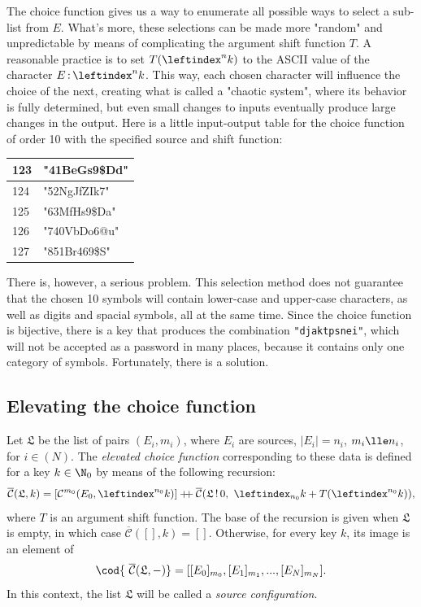 \documentclass[12pt, a4paper]{article}
\renewcommand{\C}{\mathcal{C}}
\newcommand{\CC}{\overline{\mathcal{C}}}
\newcommand{\conf}{\mathfrak{L}}
\newcommand{\dop}{\mathbin{{+}\hspace{-1mm}{+}}}
\newcommand{\lli}[1]{\leftindex_{#1}}
\newcommand{\lui}[1]{\leftindex^{#1}}
\newcommand{\elt}{\mathop{:}}
\newcommand{\wo}{\mathop{!}}
\begin{document}
The choice function gives us a way to enumerate all possible ways to select a sub-list from $ E $. What's more, these selections can be made more "random" and unpredictable by means of complicating the argument shift function $ T $. A reasonable practice is to set $ T(\lui{n}k) $ to the ASCII value of the character $ E \elt \lui{n}k $. This way, each chosen character will influence the choice of the next, creating what is called a "chaotic system", where its behavior is fully determined, but even small changes to inputs eventually produce large changes in the output. Here is a little input-output table for the choice function of order 10 with the specified source and shift function:

\begin{center}
\def\arraystretch{1.3}
\begin{tabular}{l|l}
    123 & \ttfamily"41BeGs9\$Dd"\\
    \hline
    124 & \ttfamily"52NgJfZIk7"\\
    \hline
    125 & \ttfamily"63MfHs9\$Da"\\
    \hline
    126 & \ttfamily"740VbDo6@u"\\
    \hline
    127 & \ttfamily"851Br469\$S"\\
\end{tabular}
\end{center}

There is, however, a serious problem. This selection method does not guarantee that the chosen 10 symbols will contain lower-case and upper-case characters, as well as digits and spacial symbols, all at the same time. Since the choice function is bijective, there is a key that produces the combination \texttt{"djaktpsnei"}, which will not be accepted as a password in many places, because it contains only one category of symbols. Fortunately, there is a solution.

\subsection{Elevating the choice function}

\begin{definition}
    Let $ \conf $ be the list of pairs $ (E_i, m_i) $, where $ E_i $ are sources, $ |E_i| = n_i $, $ m_i \lle n_i $, for $ i \in (N) $. The \emph{elevated choice function} corresponding to these data is defined for a key $ k \in \N_0 $ by means of the following recursion:
    \[ \CC(\conf, k) = [\C^{m_0}(E_0, \lui{n_0}k)] \dop \CC(\conf \wo 0,\ \lli{n_0}k + T(\lui{n_0}k)), \]
    where $ T $ is an argument shift function. The base of the recursion is given when $ \conf $ is empty, in which case $ \CC([], k) = [] $. Otherwise, for every key $ k $, its image is an element of
    \[ \cod{\ \CC(\conf, -)} = [[E_0]_{m_0}, [E_1]_{m_1}, ..., [E_N]_{m_N}]. \]
    In this context, the list $ \conf $ will be called a \emph{source configuration}.
\end{definition}
\end{document}
